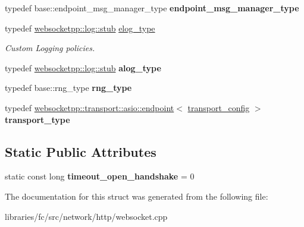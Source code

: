 \begin{DoxyCompactItemize}
\mbox{\label{structfc_1_1http_1_1detail_1_1asio__tls__with__stub__log_ac2f69eacbeb9cc8051db85cbbbbf2ff8}} 
typedef base\+::endpoint\+\_\+msg\+\_\+manager\+\_\+type {\bfseries endpoint\+\_\+msg\+\_\+manager\+\_\+type}
\item 
\mbox{\label{structfc_1_1http_1_1detail_1_1asio__tls__with__stub__log_a177a938c77ac170dcfa69a43b4931084}} 
typedef \mbox{\hyperlink{classwebsocketpp_1_1log_1_1stub}{websocketpp\+::log\+::stub}} \mbox{\hyperlink{structfc_1_1http_1_1detail_1_1asio__tls__with__stub__log_a177a938c77ac170dcfa69a43b4931084}{elog\+\_\+type}}
\begin{DoxyCompactList}\small\item\em Custom Logging policies. \end{DoxyCompactList}\item 
\mbox{\label{structfc_1_1http_1_1detail_1_1asio__tls__with__stub__log_a5fa8ec074158fe664cf1c24bc49a3cd0}} 
typedef \mbox{\hyperlink{classwebsocketpp_1_1log_1_1stub}{websocketpp\+::log\+::stub}} {\bfseries alog\+\_\+type}
\item 
\mbox{\label{structfc_1_1http_1_1detail_1_1asio__tls__with__stub__log_a5c770e22a0b5e71cde688ba68ba33210}} 
typedef base\+::rng\+\_\+type {\bfseries rng\+\_\+type}
\item 
\mbox{\label{structfc_1_1http_1_1detail_1_1asio__tls__with__stub__log_aaf9d3552aff49e6b6e0155cfc196c85f}} 
typedef \mbox{\hyperlink{classwebsocketpp_1_1transport_1_1asio_1_1endpoint}{websocketpp\+::transport\+::asio\+::endpoint}}$<$ \mbox{\hyperlink{structfc_1_1http_1_1detail_1_1asio__tls__with__stub__log_1_1transport__config}{transport\+\_\+config}} $>$ {\bfseries transport\+\_\+type}
\end{DoxyCompactItemize}
\subsection*{Static Public Attributes}
\begin{DoxyCompactItemize}
\item 
\mbox{\label{structfc_1_1http_1_1detail_1_1asio__tls__with__stub__log_a0912f9d4fb9a5313f2f3674fd6439218}} 
static const long {\bfseries timeout\+\_\+open\+\_\+handshake} = 0
\end{DoxyCompactItemize}


The documentation for this struct was generated from the following file\+:\begin{DoxyCompactItemize}
\item 
libraries/fc/src/network/http/websocket.\+cpp\end{DoxyCompactItemize}
